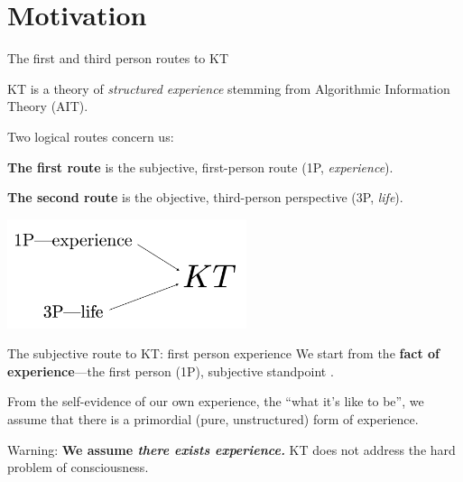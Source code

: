 




\section{Motivation}
\begin{frame}[label=intro30]{The first and third person routes to KT}

KT is a theory of \textit{structured experience} stemming from Algorithmic Information Theory (AIT). \vspace{0.5cm}

\begin{minipage}{0.5\linewidth}
    Two logical routes concern us:
    \vspace{0.5cm}
    
    \textbf{The first route} is the subjective, first-person route (1P, \textit{experience}).
    \vspace{0.5cm}
    
    \textbf{The second route} is the objective, third-person perspective (3P, \textit{life}).
\end{minipage}%
\hfill
\begin{minipage}{0.45\linewidth}
    \centering
    \includegraphics[height=3.2cm]{img/KT.png}
\end{minipage}

\end{frame}
\begin{frame}[label=intro]{The subjective route to KT: first person experience}
	We start from the \textbf{fact of experience}---the first person (1P), subjective standpoint \citep{Ruffini2017}.  \vfill
	
	From the self-evidence of our own experience, the ``what it's like to be'', we assume that there is a primordial (pure, unstructured) form of experience.\vfill
	
    \begin{alertblock}{Warning:  \textbf{We assume {\em there exists experience.}} } 
	KT does not address the hard problem of consciousness.  
	\end{alertblock}
	

\end{frame}

